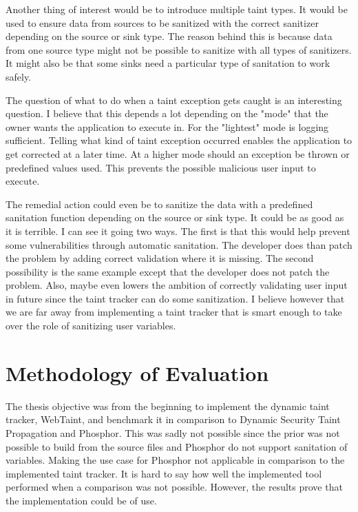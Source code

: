Another thing of interest would be to introduce multiple taint types. It would be used to ensure data from sources to be sanitized with the correct sanitizer depending on the source or sink type. The reason behind this is because data from one source type might not be possible to sanitize with all types of sanitizers. It might also be that some sinks need a particular type of sanitation to work safely. 

The question of what to do when a taint exception gets caught is an interesting question. I believe that this depends a lot depending on the "mode" that the owner wants the application to execute in. For the "lightest" mode is logging sufficient. Telling what kind of taint exception occurred enables the application to get corrected at a later time. At a higher mode should an exception be thrown or predefined values used. This prevents the possible malicious user input to execute. 

The remedial action could even be to sanitize the data with a predefined sanitation function depending on the source or sink type. It could be as good as it is terrible. I can see it going two ways. The first is that this would help prevent some vulnerabilities through automatic sanitation. The developer does than patch the problem by adding correct validation where it is missing. The second possibility is the same example except that the developer does not patch the problem. Also, maybe even lowers the ambition of correctly validating user input in future since the taint tracker can do some sanitization. I believe however that we are far away from implementing a taint tracker that is smart enough to take over the role of sanitizing user variables.



\section{Methodology of Evaluation}
\label{methev}
The thesis objective was from the beginning to implement the dynamic taint tracker, WebTaint, and benchmark it in comparison to Dynamic Security Taint Propagation and Phosphor. This was sadly not possible since the prior was not possible to build from the source files and Phosphor do not support sanitation of variables. Making the use case for Phosphor not applicable in comparison to the implemented taint tracker. It is hard to say how well the implemented tool performed when a comparison was not possible. However, the results prove that the implementation could be of use.